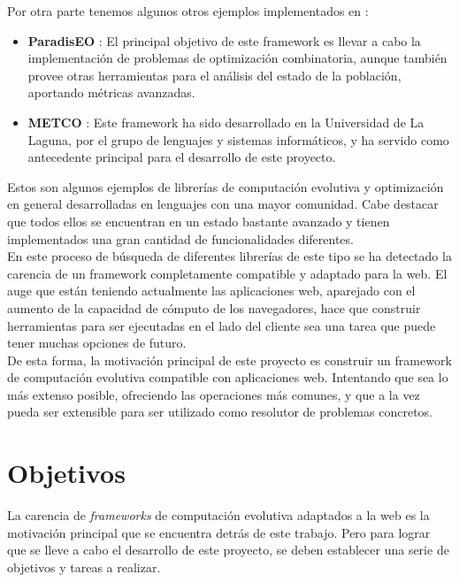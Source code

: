 Por otra parte tenemos algunos otros ejemplos implementados en \CC:

\begin{itemize}
    \item \textbf{ParadisEO} \cite{cahon2004paradiseo}: El principal objetivo de este framework es llevar a cabo la implementación de problemas de optimización combinatoria, aunque también provee otras herramientas para el análisis del estado de la población, aportando métricas avanzadas.
    \item \textbf{METCO} \cite{leon2009metco}: Este framework ha sido desarrollado en la Universidad de La Laguna, por el grupo de lenguajes y sistemas informáticos, y ha servido como antecedente principal para el desarrollo de este proyecto.
\end{itemize}

Estos son algunos ejemplos de librerías de computación evolutiva y optimización en general desarrolladas en lenguajes con una mayor comunidad. Cabe destacar que todos ellos se encuentran en un estado bastante avanzado y tienen implementados una gran cantidad de funcionalidades diferentes. \\

En este proceso de búsqueda de diferentes librerías de este tipo se ha detectado la carencia de un framework completamente compatible y adaptado para la web. El auge que están teniendo actualmente las aplicaciones web, aparejado con el aumento de la capacidad de cómputo de los navegadores, hace que construir herramientas para ser ejecutadas en el lado del cliente sea una tarea que puede tener muchas opciones de futuro. \\

De esta forma, la motivación principal de este proyecto es construir un framework de computación evolutiva compatible con aplicaciones web. Intentando que sea lo más extenso posible, ofreciendo las operaciones más comunes, y que a la vez pueda ser extensible para ser utilizado como resolutor de problemas concretos.

\section{Objetivos}
\label{1:sec:5}

La carencia de \textit{frameworks} de computación evolutiva adaptados a la web es la motivación principal que se encuentra detrás de este trabajo. Pero para lograr que se lleve a cabo el desarrollo de este proyecto, se deben establecer una serie de objetivos y tareas a realizar. \\

